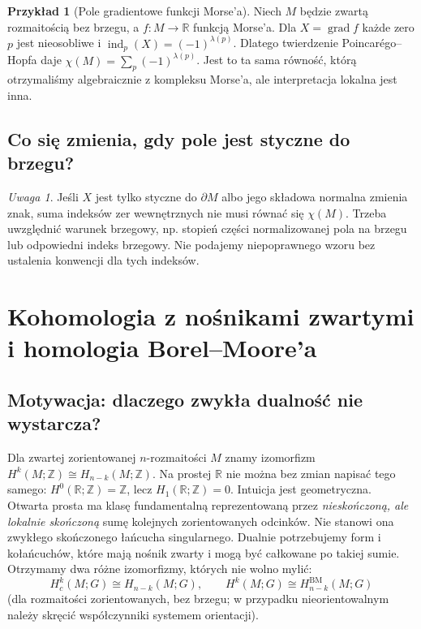 \documentclass[11pt,a4paper,oneside]{report}
\newcommand{\R}{\mathbb{R}}
\newcommand{\Z}{\mathbb{Z}}
\theoremstyle{plain}
\theoremstyle{definition}
\newtheorem{przyklad}[twierdzenie]{Przykład}
\theoremstyle{remark}
\newtheorem{uwaga}[twierdzenie]{Uwaga}
\begin{document}
\begin{przyklad}[Pole gradientowe funkcji Morse'a]
Niech $M$ będzie zwartą rozmaitością bez brzegu,
a $f:M\to\R$ funkcją Morse'a. Dla $X=\operatorname{grad}f$
każde zero $p$ jest nieosobliwe i
$\operatorname{ind}_p(X)=(-1)^{\lambda(p)}$.
Dlatego twierdzenie Poincarégo--Hopfa daje
$\chi(M)=\sum_p(-1)^{\lambda(p)}$.
Jest to ta sama równość, którą otrzymaliśmy algebraicznie
z kompleksu Morse'a, ale interpretacja lokalna jest inna.
\end{przyklad}

\section{Co się zmienia, gdy pole jest styczne do brzegu?}
\begin{uwaga}
Jeśli $X$ jest tylko styczne do $\partial M$ albo jego
składowa normalna zmienia znak, suma indeksów zer wewnętrznych
nie musi równać się $\chi(M)$. Trzeba uwzględnić warunek
brzegowy, np. stopień części normalizowanej pola na brzegu
lub odpowiedni indeks brzegowy. Nie podajemy niepoprawnego
wzoru bez ustalenia konwencji dla tych indeksów.
\end{uwaga}




\chapter{Kohomologia z nośnikami zwartymi i homologia Borel--Moore'a}
\label{ch:compact-bm-v11}

\section{Motywacja: dlaczego zwykła dualność nie wystarcza?}
Dla zwartej zorientowanej $n$-rozmaitości $M$ znamy izomorfizm
$H^k(M;\Z)\cong H_{n-k}(M;\Z)$. Na prostej $\R$ nie można
bez zmian napisać tego samego: $H^0(\R;\Z)=\Z$, lecz
$H_1(\R;\Z)=0$. Intuicja jest geometryczna.
Otwarta prosta ma klasę fundamentalną reprezentowaną przez
\emph{nieskończoną, ale lokalnie skończoną} sumę kolejnych
zorientowanych odcinków. Nie stanowi ona zwykłego skończonego
łańcucha singularnego. Dualnie potrzebujemy form i kołańcuchów,
które mają nośnik zwarty i mogą być całkowane po takiej sumie.
Otrzymamy dwa różne izomorfizmy, których nie wolno mylić:
\[
H_c^k(M;G)\cong H_{n-k}(M;G),\qquad
H^k(M;G)\cong H_{n-k}^{\mathrm{BM}}(M;G)
\]
(dla rozmaitości zorientowanych, bez brzegu; w przypadku
nieorientowalnym należy skręcić współczynniki systemem orientacji).
\end{document}
